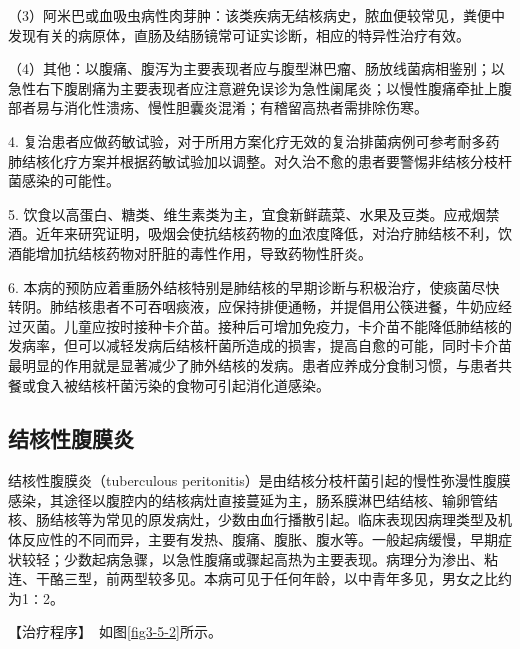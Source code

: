 （3）阿米巴或血吸虫病性肉芽肿：该类疾病无结核病史，脓血便较常见，粪便中发现有关的病原体，直肠及结肠镜常可证实诊断，相应的特异性治疗有效。

（4）其他：以腹痛、腹泻为主要表现者应与腹型淋巴瘤、肠放线菌病相鉴别；以急性右下腹剧痛为主要表现者应注意避免误诊为急性阑尾炎；以慢性腹痛牵扯上腹部者易与消化性溃疡、慢性胆囊炎混淆；有稽留高热者需排除伤寒。

4.
复治患者应做药敏试验，对于所用方案化疗无效的复治排菌病例可参考耐多药肺结核化疗方案并根据药敏试验加以调整。对久治不愈的患者要警惕非结核分枝杆菌感染的可能性。

5.
饮食以高蛋白、糖类、维生素类为主，宜食新鲜蔬菜、水果及豆类。应戒烟禁酒。近年来研究证明，吸烟会使抗结核药物的血浓度降低，对治疗肺结核不利，饮酒能增加抗结核药物对肝脏的毒性作用，导致药物性肝炎。

6.
本病的预防应着重肠外结核特别是肺结核的早期诊断与积极治疗，使痰菌尽快转阴。肺结核患者不可吞咽痰液，应保持排便通畅，并提倡用公筷进餐，牛奶应经过灭菌。儿童应按时接种卡介苗。接种后可增加免疫力，卡介苗不能降低肺结核的发病率，但可以减轻发病后结核杆菌所造成的损害，提高自愈的可能，同时卡介苗最明显的作用就是显著减少了肺外结核的发病。患者应养成分食制习惯，与患者共餐或食入被结核杆菌污染的食物可引起消化道感染。

\subsection{结核性腹膜炎}

结核性腹膜炎（tuberculous
peritonitis）是由结核分枝杆菌引起的慢性弥漫性腹膜感染，其途径以腹腔内的结核病灶直接蔓延为主，肠系膜淋巴结结核、输卵管结核、肠结核等为常见的原发病灶，少数由血行播散引起。临床表现因病理类型及机体反应性的不同而异，主要有发热、腹痛、腹胀、腹水等。一般起病缓慢，早期症状较轻；少数起病急骤，以急性腹痛或骤起高热为主要表现。病理分为渗出、粘连、干酪三型，前两型较多见。本病可见于任何年龄，以中青年多见，男女之比约为1∶2。

【治疗程序】　如图\ref{fig3-5-2}所示。

